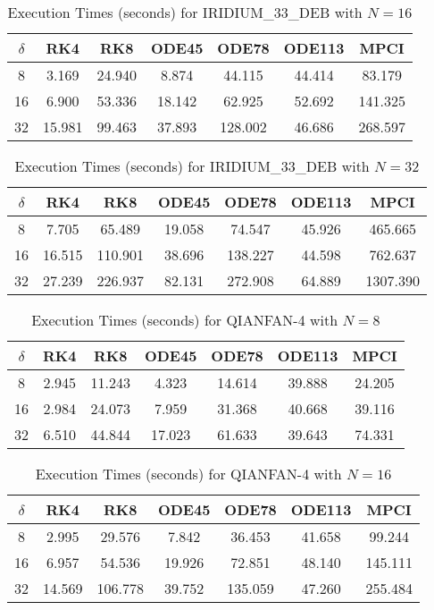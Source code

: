\begin{table}[htbp]
\centering
\begin{tabular}{|c|c|c|c|c|c|c|}
\hline
$\delta$ & RK4 & RK8 & ODE45 & ODE78 & ODE113 & MPCI \\
\hline
8 & 3.169 & 24.940 & 8.874 & 44.115 & 44.414 & 83.179 \\
\hline
16 & 6.900 & 53.336 & 18.142 & 62.925 & 52.692 & 141.325 \\
\hline
32 & 15.981 & 99.463 & 37.893 & 128.002 & 46.686 & 268.597 \\
\hline
\end{tabular}
\caption{Execution Times (seconds) for IRIDIUM\_33\_DEB with $N=16$}
\label{tab:iridium_33_deb_N16}
\end{table}

\begin{table}[htbp]
\centering
\begin{tabular}{|c|c|c|c|c|c|c|}
\hline
$\delta$ & RK4 & RK8 & ODE45 & ODE78 & ODE113 & MPCI \\
\hline
8 & 7.705 & 65.489 & 19.058 & 74.547 & 45.926 & 465.665 \\
\hline
16 & 16.515 & 110.901 & 38.696 & 138.227 & 44.598 & 762.637 \\
\hline
32 & 27.239 & 226.937 & 82.131 & 272.908 & 64.889 & 1307.390 \\
\hline
\end{tabular}
\caption{Execution Times (seconds) for IRIDIUM\_33\_DEB with $N=32$}
\label{tab:iridium_33_deb_N32}
\end{table}

\begin{table}[htbp]
\centering
\begin{tabular}{|c|c|c|c|c|c|c|}
\hline
$\delta$ & RK4 & RK8 & ODE45 & ODE78 & ODE113 & MPCI \\
\hline
8 & 2.945 & 11.243 & 4.323 & 14.614 & 39.888 & 24.205 \\
\hline
16 & 2.984 & 24.073 & 7.959 & 31.368 & 40.668 & 39.116 \\
\hline
32 & 6.510 & 44.844 & 17.023 & 61.633 & 39.643 & 74.331 \\
\hline
\end{tabular}
\caption{Execution Times (seconds) for QIANFAN-4 with $N=8$}
\label{tab:qianfan_4_N8}
\end{table}

\begin{table}[htbp]
\centering
\begin{tabular}{|c|c|c|c|c|c|c|}
\hline
$\delta$ & RK4 & RK8 & ODE45 & ODE78 & ODE113 & MPCI \\
\hline
8 & 2.995 & 29.576 & 7.842 & 36.453 & 41.658 & 99.244 \\
\hline
16 & 6.957 & 54.536 & 19.926 & 72.851 & 48.140 & 145.111 \\
\hline
32 & 14.569 & 106.778 & 39.752 & 135.059 & 47.260 & 255.484 \\
\hline
\end{tabular}
\caption{Execution Times (seconds) for QIANFAN-4 with $N=16$}
\label{tab:qianfan_4_N16}
\end{table}

